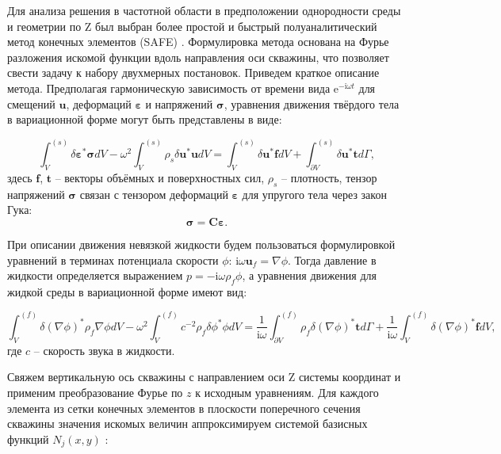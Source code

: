 \documentclass[a4paper,11pt]{article}
\newcommand{\ii}{\mathrm{i}}
\begin{document}
Для анализа решения в частотной области в предположении однородности среды и геометрии по Z был выбран более простой и быстрый полуаналитический метод конечных элементов (SAFE) \cite{Bartoli2006}. Формулировка метода основана на Фурье разложения искомой функции вдоль направления оси скважины, что позволяет свести задачу к набору двухмерных постановок. Приведем краткое описание метода. Предполагая гармоническую зависимость от времени вида $\mathrm{e}^{-\ii\omega t}$ для смещений $\mathbf{u}$, деформаций $\boldsymbol{\varepsilon}$ и напряжений $\boldsymbol{\sigma}$, уравнения движения твёрдого тела в вариационной форме могут быть представлены в виде:

\begin{equation}
\int_{V}^{(s)}\delta \boldsymbol{\varepsilon}^* \boldsymbol{\sigma} dV - \omega^2 \int_{V}^{(s)} \rho_s \delta \mathbf{u}^*\mathbf{u}dV = \int_{V}^{(s)}\delta \mathbf{u}^* \mathbf{f} dV + \int_{\partial V}^{(s)}\delta \mathbf{u}^* \mathbf{t} d\Gamma, \label{var_eq_solid}
\end{equation}
здесь $\mathbf{f}$, $\mathbf{t}$ -- векторы объёмных и поверхностных сил, $\rho_s$ -- плотность, тензор напряжений $\boldsymbol{\sigma}$ связан с тензором деформаций $\boldsymbol{\varepsilon}$ для упругого тела через закон Гука:
$$
\boldsymbol{\sigma} = \mathbf{C}\boldsymbol{\varepsilon}.
$$

При описании движения невязкой жидкости будем пользоваться формулировкой уравнений в терминах потенциала скорости $\phi$: $\ii \omega \mathbf{u}_f = \nabla \phi$. Тогда давление в жидкости определяется выражением $p = -\ii \omega \rho_f \phi$, а уравнения движения для жидкой среды в вариационной форме имеют вид: 

\begin{equation}
\int_{V}^{(f)} \delta (\nabla\phi)^* \rho_f  \nabla \phi dV - \omega^2 \int_{V}^{(f)}  c^{-2} \rho_f \delta \phi^*  \phi dV = \frac{1}{\ii\omega}\int_{\partial V}^{(f)} \rho_f \delta(\nabla \phi)^* \mathbf{t} d\Gamma + \frac{1}{\ii\omega} \int_{V}^{(f)} \delta(\nabla \phi)^* \mathbf{f} dV, \label{var_eq_fluid}
\end{equation}
где $c$ -- скорость звука в жидкости.

Свяжем вертикальную ось скважины с направлением оси Z системы координат и применим преобразование Фурье по $z$ к исходным уравнениям. Для каждого элемента из сетки конечных элементов в плоскости поперечного сечения скважины значения искомых величин аппроксимируем системой базисных функций $N_j(x,y)$ \cite{Zienkiewicz2000}:
\end{document}
